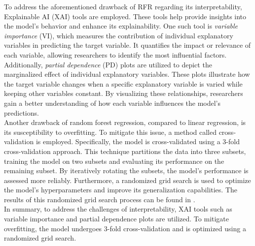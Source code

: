 \noindent
To address the aforementioned drawback of RFR regarding its interpretability, Explainable AI (XAI) tools are employed. These tools help provide insights into the model's behavior and enhance its explainability. One such tool is \textit{variable importance} (VI), which measures the contribution of individual explanatory variables in predicting the target variable. It quantifies the impact or relevance of each variable, allowing researchers to identify the most influential factors. Additionally, \textit{partial dependence} (PD) plots are utilized to depict the marginalized effect of individual explanatory variables. These plots illustrate how the target variable changes when a specific explanatory variable is varied while keeping other variables constant. By visualizing these relationships, researchers gain a better understanding of how each variable influences the model's predictions. \\

\noindent
Another drawback of random forest regression, compared to linear regression, is its susceptibility to overfitting. To mitigate this issue, a method called cross-validation is employed. Specifically, the model is cross-validated using a 3-fold cross-validation approach. This technique partitions the data into three subsets, training the model on two subsets and evaluating its performance on the remaining subset. By iteratively rotating the subsets, the model's performance is assessed more reliably. Furthermore, a randomized grid search is used to optimize the model's hyperparameters and improve its generalization capabilities. The results of this randomized grid search process can be found in . \\

\noindent
In summary, to address the challenges of interpretability, XAI tools such as variable importance and partial dependence plots are utilized. To mitigate overfitting, the model undergoes 3-fold cross-validation and is optimized using a randomized grid search.